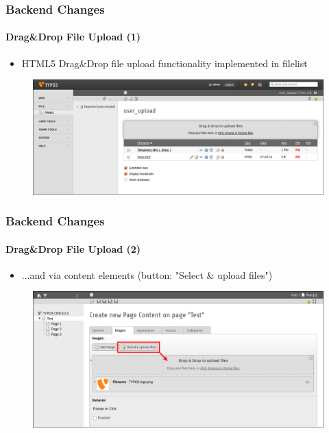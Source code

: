 
\begin{frame}[fragile]
	\frametitle{Backend Changes}
	\framesubtitle{Drag\&Drop File Upload (1)}

	\begin{itemize}
		\item HTML5 Drag\&Drop file upload functionality implemented in filelist

	\end{itemize}

	\begin{figure}
		\includegraphics[width=0.95\linewidth]{Images/BackendChanges/DragDropFileUpload.png}
	\end{figure}

\end{frame}


\begin{frame}[fragile]
	\frametitle{Backend Changes}
	\framesubtitle{Drag\&Drop File Upload (2)}

	\begin{itemize}
		\item ...and via content elements (button: "Select \& upload files")

	\end{itemize}

	\begin{figure}
		\includegraphics[width=0.95\linewidth]{Images/BackendChanges/SelectAndUploadFiles.png}
	\end{figure}

\end{frame}

